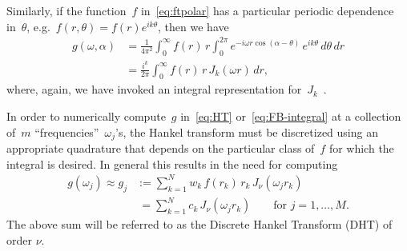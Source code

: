 Similarly, if the function~$f$ in~\eqref{eq:ftpolar} has a particular periodic
dependence in~$\theta$, e.g.~$f(r,\theta) = f(r)e^{ik\theta}$, then we have
\begin{equation} \label{eq:FB-integral}
  \begin{aligned}
  g(\omega,\alpha) &= \frac{1}{4\pi^2} \int_0^\infty f(r) \, r \int_0^{2\pi} 
  e^{-i \omega r \cos(\alpha - \theta) } \, e^{ik\theta}  \, d\theta \, dr \\
  &= \frac{i^k}{2\pi} \int_0^\infty f(r) \, r \, J_k(\omega r)  \, dr,
  \end{aligned}
\end{equation}
where, again, we have invoked an integral representation
for~$J_k$~\cite{olver2010nist}. 

In order to numerically compute~$g$ in~\eqref{eq:HT} or~\eqref{eq:FB-integral}
at a collection of~$m$ ``frequencies''~$\omega_j$'s, the Hankel transform must
be discretized using an appropriate quadrature that depends on the particular
class of~$f$ for which the integral is desired. In general this results in the
need for computing
\begin{equation} \label{eq:DHT}
  \begin{aligned}
  g(\omega_j) \approx 
  g_j &:= \sum_{k=1}^N w_k \, f(r_k) \, r_k \, J_\nu(\omega_j r_k) \\
  &\ = \sum_{k=1}^N c_k \, J_\nu(\omega_j r_k)
   \qquad \text{for } j = 1, \ldots, M.
  \end{aligned}
\end{equation}
The above sum will be referred to as the Discrete Hankel Transform (DHT) of
order $\nu$. 

